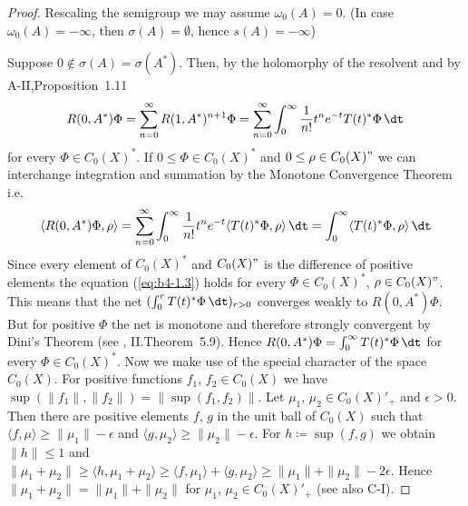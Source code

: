 \begin{proof}
Rescaling the semigroup we may assume $\omega_{0}(A) = 0$. (In case $\omega_{0}(A) = -\infty$, then $\sigma(A) = \emptyset$, hence $s(A) = -\infty$)

Suppose $0 \notin \sigma(A) = \sigma(A^*)$. Then, by the holomorphy of the resolvent and by A-II,Proposition~1.11
\[
   R(0,A^*)\Phi = \sum_{n=0}^{\infty} R(1,A^*)^{n+1}\Phi = \sum_{n=0}^{\infty} \int_0^{\infty} \frac{1}{n!} t^n e^{-t}T(t)^*\Phi \, \dt
\]  
 for every  $\Phi \in C_{0}(X)^*$. If $0 \leq \Phi \in C_{0}(X)^*$ and $0 \leq \rho \in C_{0}(X)"$ we can interchange integration and summation by the Monotone Convergence Theorem i.e.
\begin{equation}\label{eq:b4-1.3}
   \langle R(0,A^*)\Phi,\rho \rangle = \sum_{n=0}^{\infty} \int_0^{\infty} \frac{1}{n!} t^n e^{-t}\langle T(t)^*\Phi,\rho \rangle \, \dt = \int_0^{\infty} \langle T(t)^*\Phi,\rho \rangle \, \dt
\end{equation}
Since every element of $C_{0}(X)^*$ and $C_{0}(X)"$ is the difference of positive
%
%
%
\newpage
elements the equation (\ref{eq:b4-1.3}) holds for every $\Phi \in C_{0}(X)^*$, $\rho \in C_{0}(X)"$. 
This means that the net $(\int_0^r T(t)^*\Phi \, \dt)_{r > 0}$ converges weakly to $R(0,A^*)\Phi$. 
But for positive $\Phi$ the net is monotone and therefore strongly convergent by Dini's Theorem (see \citet{schaefer:1974}, II.Theorem~5.9). Hence $R(0,A^*)\Phi = \int_0^{\infty} T(t)^*\Phi \, \dt$ for every $\Phi \in C_{0}(X)^*$.
Now we make use of the special character of the space $C_{0}(X)$. For positive functions $f_1$, $f_2 \in C_{0}(X)$ we have $\sup(\|f_1\|,\|f_2\|) = \|\sup(f_1,f_2)\|$. Let $\mu_1$, $\mu_2 \in C_{0}(X)'_+$ and $\epsilon  >  0$. Then there are positive elements $f$, $g$ in the unit ball of $C_{0}(X)$ such that $\langle f,\mu \rangle \geq \|\mu_1\| - \epsilon$ and $\langle g,\mu_2 \rangle \geq \|\mu_2\| - \epsilon$. For $h \coloneq \sup(f,g)$ we obtain $\|h\| \leq 1$ and $\|\mu_1 + \mu_2\| \geq \langle h,\mu_1 + \mu_2 \rangle \geq \langle f,\mu_1 \rangle + \langle g,\mu_2 \rangle \geq \|\mu_1\| + \|\mu_2\| - 2\epsilon$.
Hence $\|\mu_1 + \mu_2\| = \|\mu_1\| + \|\mu_2\|$ for $\mu_1$, $\mu_2 \in C_{0}(X)'_+$ (see also C-I).


\end{proof}
